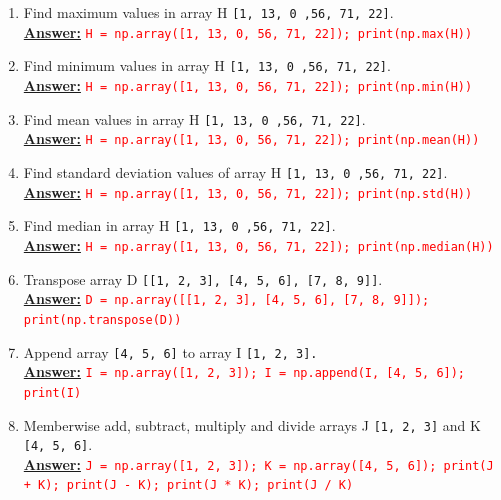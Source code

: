 \documentclass{book}
\begin{document}
\begin{enumerate}
    \vspace{1.5mm}
    \item Find maximum values in array H \texttt{[1, 13, 0 ,56, 71, 22]}.\\
    \underline{\textbf{Answer:}} \textcolor{red}{\texttt{H = np.array([1, 13, 0, 56, 71, 22]); print(np.max(H))}}
    \vspace{1.5mm}
    \item Find minimum values in array H \texttt{[1, 13, 0 ,56, 71, 22]}.\\
    \underline{\textbf{Answer:}} \textcolor{red}{\texttt{H = np.array([1, 13, 0, 56, 71, 22]); print(np.min(H))}}
    \vspace{1.5mm}
    \item Find mean values in array H \texttt{[1, 13, 0 ,56, 71, 22]}.\\
    \underline{\textbf{Answer:}} \textcolor{red}{\texttt{H = np.array([1, 13, 0, 56, 71, 22]); print(np.mean(H))}}
    \vspace{1.5mm}
    \item Find standard deviation values of array H \texttt{[1, 13, 0 ,56, 71, 22]}.\\
    \underline{\textbf{Answer:}} \textcolor{red}{\texttt{H = np.array([1, 13, 0, 56, 71, 22]); print(np.std(H))}}
    \vspace{1.5mm}
    \item Find median in array H \texttt{[1, 13, 0 ,56, 71, 22]}.\\
    \underline{\textbf{Answer:}} \textcolor{red}{\texttt{H = np.array([1, 13, 0, 56, 71, 22]); print(np.median(H))}}
    \vspace{1.5mm}
    \item Transpose array D \texttt{[[1, 2, 3], [4, 5, 6], [7, 8, 9]]}.\\
    \underline{\textbf{Answer:}} \textcolor{red}{\texttt{D = np.array([[1, 2, 3], [4, 5, 6], [7, 8, 9]]); print(np.transpose(D))}}
    \vspace{1.5mm}
    \item Append array \texttt{[4, 5, 6]} to array I \texttt{[1, 2, 3].}\\
    \underline{\textbf{Answer:}} \textcolor{red}{\texttt{I = np.array([1, 2, 3]); I = np.append(I, [4, 5, 6]); print(I)}}
    \vspace{1.5mm}
    \item Memberwise add, subtract, multiply and divide arrays J \texttt{[1, 2, 3]} and K \texttt{[4, 5, 6]}.\\
    \underline{\textbf{Answer:}} \textcolor{red}{\texttt{J = np.array([1, 2, 3]); K = np.array([4, 5, 6]); print(J + K); print(J - K); print(J * K); print(J / K)}}

\end{enumerate}
\end{document}
